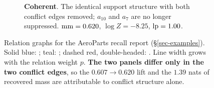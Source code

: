 \begin{figure}[t]
\begin{subfigure}[t]{0.49\textwidth}
{}
\caption{\textbf{Coherent}. The identical support structure with both conflict edges
  removed; $a_{10}$ and $a_7$ are no longer suppressed.
  $\mathrm{mm}=0.620$, $\log Z=-8.25$, $\mathrm{lp}=1.00$.}
\label{fig:aero-coherent}
\end{subfigure}
\caption{Relation graphs for the AeroParts recall report
  (\S\ref{sec-examples}). Solid blue: ; teal:
  ; dashed red, double-headed: . Line
  width grows with the relation weight $p$. \textbf{The two panels differ only in
  the two conflict edges}, so the $0.607\!\to\!0.620$ lift and the $1.39$ nats of
  recovered mass are attributable to conflict structure alone.}
\label{fig:aero-graphs}
\end{figure}
